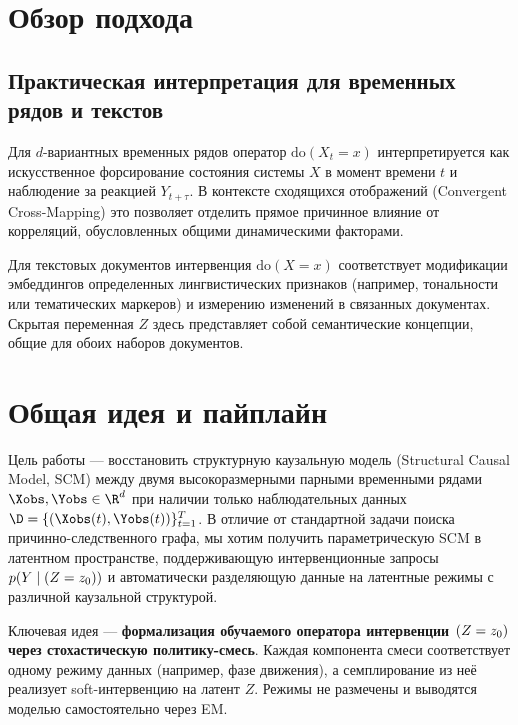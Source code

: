 \documentclass[a4paper,14pt]{article}
\theoremstyle{plain} %
\theoremstyle{definition} %
\theoremstyle{remark} %
\begin{document}
\section{Обзор подхода}
\label{sec:overview}

\subsection{Практическая интерпретация для временных рядов и текстов}

Для $d$-вариантных временных рядов оператор $\text{do}(X_t = x)$ интерпретируется как искусственное форсирование состояния системы $X$ в момент времени $t$ и наблюдение за реакцией $Y_{t+\tau}$. В контексте сходящихся отображений (Convergent Cross-Mapping) это позволяет отделить прямое причинное влияние от корреляций, обусловленных общими динамическими факторами.

Для текстовых документов интервенция $\text{do}(X = x)$ соответствует модификации эмбеддингов определенных лингвистических признаков (например, тональности или тематических маркеров) и измерению изменений в связанных документах. Скрытая переменная $Z$ здесь представляет собой семантические концепции, общие для обоих наборов документов.

\section{Общая идея и пайплайн}

Цель работы --- восстановить структурную каузальную модель (Structural Causal Model, SCM) между двумя высокоразмерными парными временными рядами $\Xobs, \Yobs \in \R^d$ при наличии только наблюдательных данных $\D = \{(\Xobs(t), \Yobs(t))\}_{t=1}^{T}$. В отличие от стандартной задачи поиска причинно-следственного графа, мы хотим получить параметрическую SCM в латентном пространстве, поддерживающую интервенционные запросы $p(Y \mid \do(Z = z_0))$ и автоматически разделяющую данные на латентные режимы с различной каузальной структурой.

Ключевая идея --- \textbf{формализация обучаемого оператора интервенции $\do(Z = z_0)$ через стохастическую политику-смесь}. Каждая компонента смеси соответствует одному режиму данных (например, фазе движения), а семплирование из неё реализует soft-интервенцию на латент $Z$. Режимы не размечены и выводятся моделью самостоятельно через EM.
\end{document}
